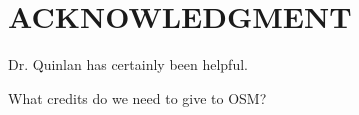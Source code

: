 \documentclass[letterpaper, 10 pt, conference]{ieeeconf}  %
\begin{document}

\section*{ACKNOWLEDGMENT}

Dr. Quinlan has certainly been helpful.

What credits do we need to give to OSM?








\end{document}
